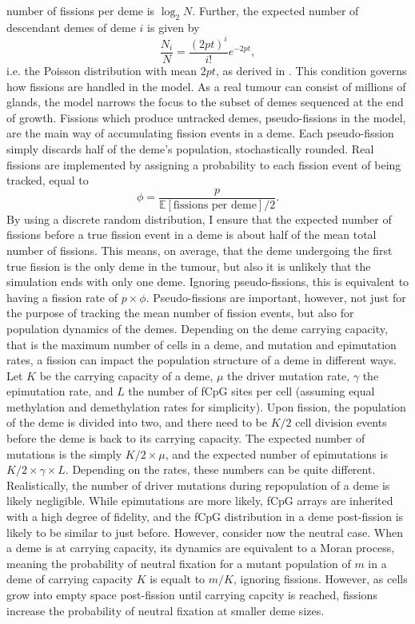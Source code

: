 number of fissions per deme is $\log_2N$. Further, the expected number of
 descendant demes of deme $i$ is given by
\begin{equation}
    \frac{N_i}{N} = \frac{(2pt)^i}{i!}e^{-2pt},
\end{equation}
i.e. the Poisson distribution with mean $2pt$, as derived in
\cite{kharlamov_generation}. This condition governs how fissions are handled in
the model. As a real tumour can consist of millions of glands, the model narrows
the focus to the subset of demes sequenced at the end of growth. Fissions which
produce untracked demes, pseudo-fissions in the model, are the main way of
accumulating fission events in a deme. Each pseudo-fission simply discards half
of the deme's population, stochastically rounded. Real fissions are implemented
by assigning a probability to each fission event of being tracked, equal to
\begin{equation}
    \phi = \frac{p}{\mathbb{E}[\text{fissions per deme}]/2}.
\end{equation}
By using a discrete random distribution, I ensure that the expected number of
fissions before a true fission event in a deme is about half of the mean total
number of fissions. This means, on average, that the deme undergoing the first
true fission is the only deme in the tumour, but also it is unlikely that the
simulation ends with only one deme. Ignoring pseudo-fissions, this is
equivalent to having a fission rate of $p\times\phi$. Pseudo-fissions are
important, however, not just for the purpose of tracking the mean number of
fission events, but also for population dynamics of the demes. Depending on the
deme carrying capacity, that is the maximum number of cells in a deme, and
mutation and epimutation rates, a fission can impact the population structure
of a deme in different ways. Let $K$ be the carrying capacity of a deme, $\mu$
the driver mutation rate, $\gamma$ the epimutation rate, and $L$ the number of
fCpG sites per cell (assuming equal methylation and demethylation rates for
simplicity). Upon fission, the population of the deme is divided into two, and
there need to be $K/2$ cell division events before the deme is back to its
carrying capacity. The expected number of mutations is the simply
$K/2\times\mu$, and the expected number of epimutations is
$K/2\times\gamma\times L$. Depending on the rates, these numbers can be quite
different. Realistically, the number of driver mutations during repopulation of
a deme is likely negligible. While epimutations are more likely, fCpG arrays
are inherited with a high degree of fidelity, and the fCpG distribution in a
deme post-fission is likely to be similar to just before. However, consider now
the neutral case. When a deme is at carrying capacity, its dynamics are
equivalent to a Moran process, meaning the probability of neutral fixation for
a mutant population of $m$ in a deme of carrying capacity $K$ is equalt to
$m/K$, ignoring fissions. However, as cells grow into empty space post-fission
until carrying capcity is reached, fissions increase the probability of neutral
fixation at smaller deme sizes.

